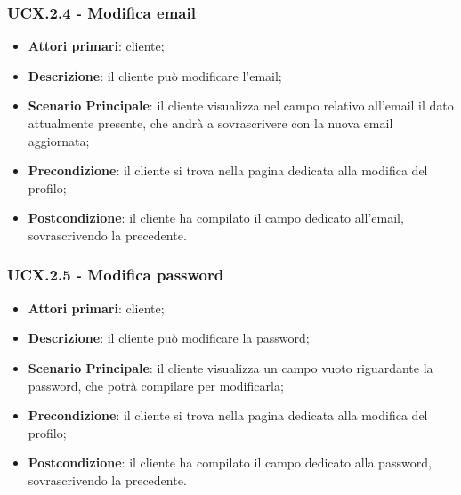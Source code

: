 \subsubsection{UCX.2.4 - Modifica email}
\begin{itemize}
\item \textbf{Attori primari}: cliente;
\item \textbf{Descrizione}: il cliente può modificare l'email;
\item \textbf{Scenario Principale}: il cliente visualizza nel campo relativo all'email il dato attualmente presente, che andrà a sovrascrivere con la nuova email aggiornata;
\item \textbf{Precondizione}: il cliente si trova nella pagina dedicata alla modifica del profilo;
\item \textbf{Postcondizione}: il cliente ha compilato il campo dedicato all'email, sovrascrivendo la precedente.
\end{itemize}

\subsubsection{UCX.2.5 - Modifica password}
\begin{itemize}
\item \textbf{Attori primari}: cliente;
\item \textbf{Descrizione}: il cliente può modificare la password;
\item \textbf{Scenario Principale}: il cliente visualizza un campo vuoto riguardante la password, che potrà compilare per modificarla;
\item \textbf{Precondizione}: il cliente si trova nella pagina dedicata alla modifica del profilo;
\item \textbf{Postcondizione}: il cliente ha compilato il campo dedicato alla password, sovrascrivendo la precedente.
\end{itemize}

